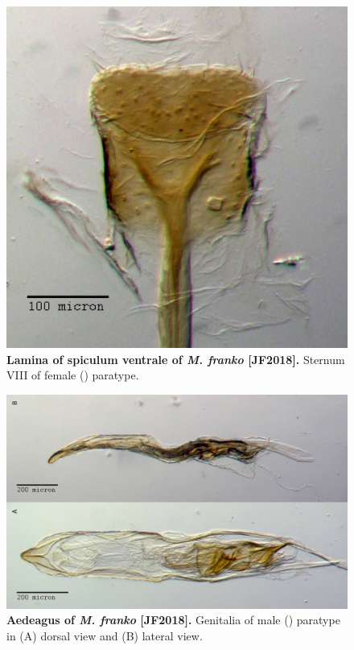 \documentclass[fleqn,10pt,lineno]{wlpeerj} %
\begin{document}
\begin{figure}[h]
	\centering
	\includegraphics[width=\textwidth]{figure14.jpg}
	\caption{\textbf{Lamina of spiculum ventrale of \textit{M. franko} [JF2018].} Sternum VIII of female (\female) paratype.}
	\label{fig:franko_lamina}
\end{figure}

\begin{figure}[h]
	\centering
	\begin{sideways}
		\includegraphics[width=0.95\textheight]{figure15.jpg}
	\end{sideways}
	\caption{\textbf{Aedeagus of \textit{M. franko} [JF2018].} Genitalia of male (\male) paratype in (A) dorsal view and (B) lateral view.}
	\label{fig:franko_aedeagus}
\end{figure}
\end{document}
